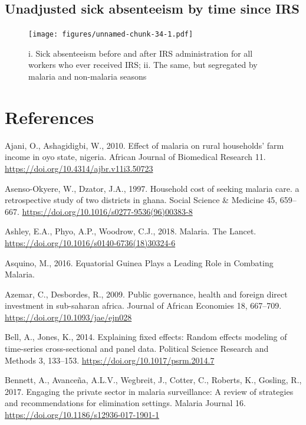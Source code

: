 \documentclass[]{article}
\begin{document}
\subsection{Unadjusted sick absenteeism by time since
IRS}\label{unadjusted-sick-absenteeism-by-time-since-irs}

\begin{figure}
\centering
\texttt{[image: figures/unnamed-chunk-34-1.pdf]}
\caption{i. Sick absenteeism before and after IRS administration for all
workers who ever received IRS; ii. The same, but segregated by malaria
and non-malaria seasons}
\end{figure}

\section*{References}\label{references}

\hypertarget{refs}{}
\hypertarget{ref-Ajani2010}{}
Ajani, O., Ashagidigbi, W., 2010. Effect of malaria on rural households'
farm income in oyo state, nigeria. African Journal of Biomedical
Research 11. \url{https://doi.org/10.4314/ajbr.v11i3.50723}

\hypertarget{ref-AsensoOkyere1997}{}
Asenso-Okyere, W., Dzator, J.A., 1997. Household cost of seeking malaria
care. a retrospective study of two districts in ghana. Social Science \&
Medicine 45, 659--667.
\url{https://doi.org/10.1016/s0277-9536(96)00383-8}

\hypertarget{ref-Ashley2018}{}
Ashley, E.A., Phyo, A.P., Woodrow, C.J., 2018. Malaria. The Lancet.
\url{https://doi.org/10.1016/s0140-6736(18)30324-6}

\hypertarget{ref-asquino2015}{}
Asquino, M., 2016. Equatorial Guinea Plays a Leading Role in Combating
Malaria.

\hypertarget{ref-Azemar2009}{}
Azemar, C., Desbordes, R., 2009. Public governance, health and foreign
direct investment in sub-saharan africa. Journal of African Economies
18, 667--709. \url{https://doi.org/10.1093/jae/ejn028}

\hypertarget{ref-Bell2014}{}
Bell, A., Jones, K., 2014. Explaining fixed effects: Random effects
modeling of time-series cross-sectional and panel data. Political
Science Research and Methods 3, 133--153.
\url{https://doi.org/10.1017/psrm.2014.7}

\hypertarget{ref-Bennett_2017}{}
Bennett, A., Avanceña, A.L.V., Wegbreit, J., Cotter, C., Roberts, K.,
Gosling, R., 2017. Engaging the private sector in malaria surveillance:
A review of strategies and recommendations for elimination settings.
Malaria Journal 16. \url{https://doi.org/10.1186/s12936-017-1901-1}
\end{document}
